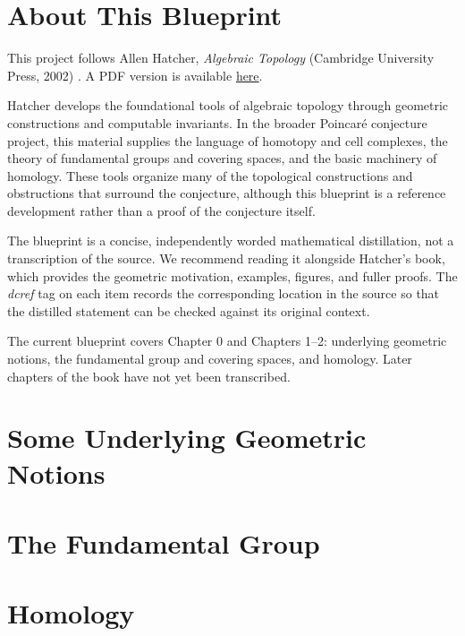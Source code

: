 

\chapter*{About This Blueprint}

This project follows Allen Hatcher, \emph{Algebraic Topology} (Cambridge
University Press, 2002) \cite{Hatcher2002}.
A PDF version is available
\href{https://pi.math.cornell.edu/~hatcher/AT/AT.pdf}{here}.

Hatcher develops the foundational tools of algebraic topology through geometric
constructions and computable invariants.  In the broader Poincar\'e conjecture
project, this material supplies the language of homotopy and cell complexes,
the theory of fundamental groups and covering spaces, and the basic machinery
of homology.  These tools organize many of the topological constructions and
obstructions that surround the conjecture, although this blueprint is a
reference development rather than a proof of the conjecture itself.

The blueprint is a concise, independently worded mathematical distillation,
not a transcription of the source.  We recommend reading it alongside
Hatcher's book, which provides the geometric motivation, examples, figures,
and fuller proofs.  The \emph{dcref} tag on each item records the corresponding
location in the source so that the distilled statement can be checked against
its original context.

The current blueprint covers Chapter 0 and Chapters 1--2: underlying geometric
notions, the fundamental group and covering spaces, and homology.  Later
chapters of the book have not yet been transcribed.

\chapter{Some Underlying Geometric Notions}
\label{chap:geometric-notions}


\chapter{The Fundamental Group}
\label{chap:fundamental-group}


\chapter{Homology}
\label{chap:homology}


